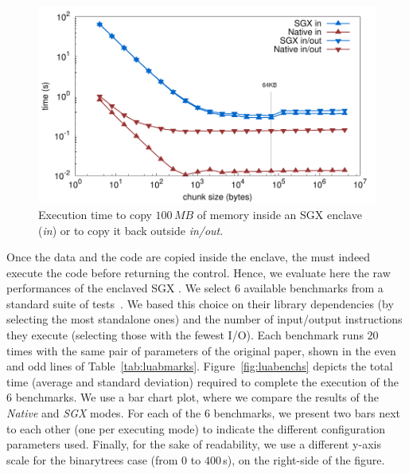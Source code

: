 \begin{figure}[t!]
  \centering
  \includegraphics[width=0.75\linewidth]{Figures/plots/memcpy/memcpy}
  \caption{Execution time to copy $100\,\mathit{MB}$ of memory inside an SGX enclave (\emph{in}) or to copy it back outside {\emph{in/out}.} }
  \label{fig:sgxmemcpy}
\end{figure}

Once the data and the code are copied inside the enclave, the \luavm must indeed execute the code before returning the control.
Hence, we evaluate here the raw performances of the enclaved SGX \luavm.
We select $6$ available benchmarks from a standard suite of tests~\cite{bolz2015}.
We based this choice on their library dependencies (by selecting the most standalone ones) and the number of input/output instructions they execute (selecting those with the fewest I/O).
Each benchmark runs $20$ times with the same pair of parameters of the original paper, shown in the even and odd lines of Table~\ref{tab:luabmarks}.
Figure~\ref{fig:luabenchs} depicts the total time (average and standard deviation) required to complete the execution of the $6$ benchmarks.
We use a bar chart plot, where we compare the results of the \emph{Native} and \emph{SGX} modes.
For each of the $6$ benchmarks, we present two bars next to each other (one per executing mode) to indicate the different configuration parameters used.
Finally, for the sake of readability, we use a different y-axis scale for the \textsf{binarytrees} case (from $0$ to $400$\,s), on the right-side of the figure.

